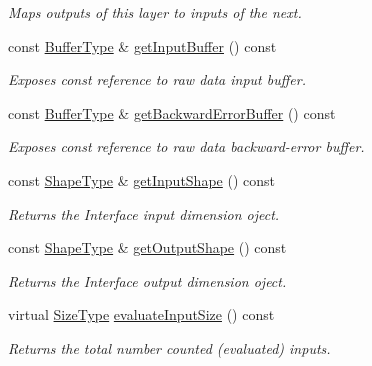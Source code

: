 \begin{DoxyCompactItemize}
\begin{DoxyCompactList}\small\item\em Maps outputs of this layer to inputs of the next. \end{DoxyCompactList}\item 
const \hyperlink{classffnn_1_1layer_1_1_layer_ad9cab24dbd0cbed2febed5b635f81722}{Buffer\-Type} \& \hyperlink{classffnn_1_1layer_1_1_layer_a8049c939bc452bd5453227d1ce1a35f3}{get\-Input\-Buffer} () const 
\begin{DoxyCompactList}\small\item\em Exposes const reference to raw data input buffer. \end{DoxyCompactList}\item 
const \hyperlink{classffnn_1_1layer_1_1_layer_ad9cab24dbd0cbed2febed5b635f81722}{Buffer\-Type} \& \hyperlink{classffnn_1_1layer_1_1_layer_a0caad62750e9610e607fb18d87df63b8}{get\-Backward\-Error\-Buffer} () const 
\begin{DoxyCompactList}\small\item\em Exposes const reference to raw data backward-\/error buffer. \end{DoxyCompactList}\item 
const \hyperlink{classffnn_1_1layer_1_1_layer_ab80478345a2579402ae086a2f7de1ca2}{Shape\-Type} \& \hyperlink{classffnn_1_1layer_1_1_layer_a0f69fc9185b2d496fea7be9a5d9adb62}{get\-Input\-Shape} () const 
\begin{DoxyCompactList}\small\item\em Returns the Interface input dimension oject. \end{DoxyCompactList}\item 
const \hyperlink{classffnn_1_1layer_1_1_layer_ab80478345a2579402ae086a2f7de1ca2}{Shape\-Type} \& \hyperlink{classffnn_1_1layer_1_1_layer_a2b6713211f1a5e702ce9ce8cd72e4854}{get\-Output\-Shape} () const 
\begin{DoxyCompactList}\small\item\em Returns the Interface output dimension oject. \end{DoxyCompactList}\item 
virtual \hyperlink{classffnn_1_1layer_1_1_layer_a4c4c9782d2aed41c2a5000ec5da5601a}{Size\-Type} \hyperlink{classffnn_1_1layer_1_1_layer_afdc489e04b2b1e716940f598ac474e4c}{evaluate\-Input\-Size} () const 
\begin{DoxyCompactList}\small\item\em Returns the total number counted (evaluated) inputs. \end{DoxyCompactList}\item 

\end{DoxyCompactItemize}
